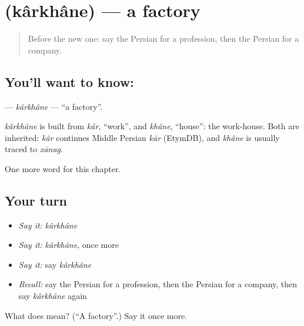 \section[\texorpdfstring{\fa{کارخانه} (kârkhâne)}{کارخانه (kârkhâne)}]{ (kârkhâne) — a factory}

\label{lesson:FA-C176-karkhane}



\begin{quote}
Before the new one: say the Persian for a profession, then the Persian for a company.
\end{quote}

\subsection*{You'll want to know: }
\textbf{} — \emph{kârkhâne} — \textquotedblleft{}a factory\textquotedblright{}.

\begin{cousinweb}
\emph{kârkhâne} is built from \emph{kâr}, \textquotedblleft{}work\textquotedblright{}, and \emph{khâne}, \textquotedblleft{}house\textquotedblright{}: the work-house. Both are inherited: \emph{kâr} continues Middle Persian \emph{kār} (EtymDB), and \emph{khâne} is usually traced to \emph{xānag}.
\end{cousinweb}

\begin{grammarlens}[title={What you've built}]
One more word for this chapter.
\end{grammarlens}

\subsection*{Your turn}
\begin{itemize}
\raggedright
  \item \emph{Say it:} \emph{kârkhâne}
  \item \emph{Say it:} \emph{kârkhâne}, once more
  \item \emph{Say it:} say \emph{kârkhâne}
  \item \emph{Recall:} say the Persian for a profession, then the Persian for a company, then say \emph{kârkhâne} again
\end{itemize}

\begin{tcolorbox}[breakable,colback=teal!4,colframe=teal!35!black,title={Before you move on}]
What does  mean? (\textquotedblleft{}A factory\textquotedblright{}.) Say it once more.
\end{tcolorbox}
